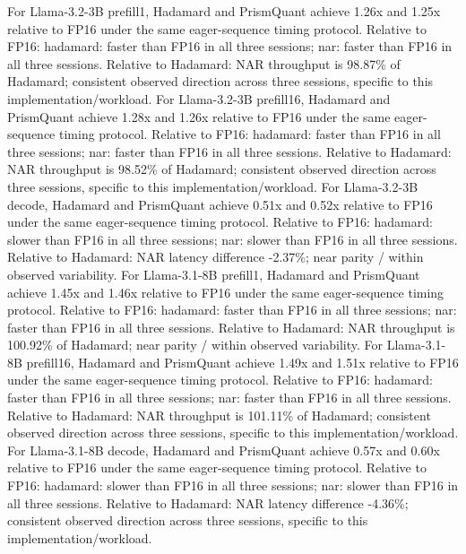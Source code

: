 For Llama-3.2-3B prefill1, Hadamard and PrismQuant achieve 1.26x and 1.25x relative to FP16 under the same eager-sequence timing protocol. Relative to FP16: hadamard: faster than FP16 in all three sessions; nar: faster than FP16 in all three sessions. Relative to Hadamard: NAR throughput is 98.87\% of Hadamard; consistent observed direction across three sessions, specific to this implementation/workload. For Llama-3.2-3B prefill16, Hadamard and PrismQuant achieve 1.28x and 1.26x relative to FP16 under the same eager-sequence timing protocol. Relative to FP16: hadamard: faster than FP16 in all three sessions; nar: faster than FP16 in all three sessions. Relative to Hadamard: NAR throughput is 98.52\% of Hadamard; consistent observed direction across three sessions, specific to this implementation/workload. For Llama-3.2-3B decode, Hadamard and PrismQuant achieve 0.51x and 0.52x relative to FP16 under the same eager-sequence timing protocol. Relative to FP16: hadamard: slower than FP16 in all three sessions; nar: slower than FP16 in all three sessions. Relative to Hadamard: NAR latency difference -2.37\%; near parity / within observed variability. For Llama-3.1-8B prefill1, Hadamard and PrismQuant achieve 1.45x and 1.46x relative to FP16 under the same eager-sequence timing protocol. Relative to FP16: hadamard: faster than FP16 in all three sessions; nar: faster than FP16 in all three sessions. Relative to Hadamard: NAR throughput is 100.92\% of Hadamard; near parity / within observed variability. For Llama-3.1-8B prefill16, Hadamard and PrismQuant achieve 1.49x and 1.51x relative to FP16 under the same eager-sequence timing protocol. Relative to FP16: hadamard: faster than FP16 in all three sessions; nar: faster than FP16 in all three sessions. Relative to Hadamard: NAR throughput is 101.11\% of Hadamard; consistent observed direction across three sessions, specific to this implementation/workload. For Llama-3.1-8B decode, Hadamard and PrismQuant achieve 0.57x and 0.60x relative to FP16 under the same eager-sequence timing protocol. Relative to FP16: hadamard: slower than FP16 in all three sessions; nar: slower than FP16 in all three sessions. Relative to Hadamard: NAR latency difference -4.36\%; consistent observed direction across three sessions, specific to this implementation/workload.
